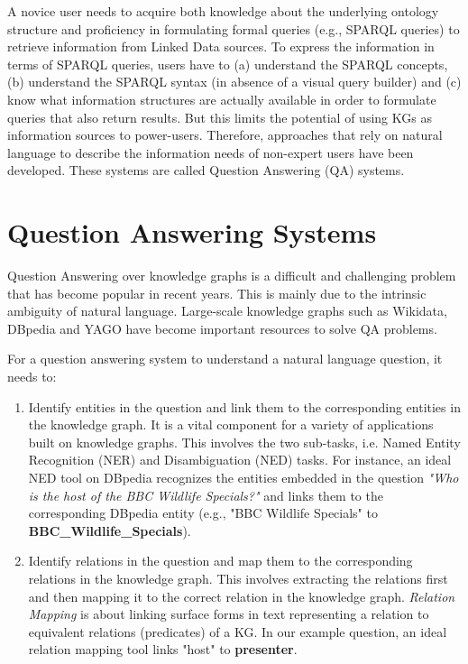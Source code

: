 \begin{sloppypar}
A novice user needs to acquire both knowledge about the underlying ontology structure and proficiency in formulating formal queries (e.g., SPARQL queries) to retrieve information from Linked Data sources. To express the information in terms of SPARQL queries, users have to (a) understand the SPARQL concepts, (b) understand the SPARQL syntax (in absence of a visual query builder) and (c) know what information structures are actually available in order to formulate queries that also return results\cite{sparql}. But this limits the potential of using KGs as information sources to power-users. Therefore, approaches that rely on natural language to describe the information needs of non-expert users have been developed. These systems are called Question Answering (QA) systems.

\section{Question Answering Systems}
Question Answering over knowledge graphs is a difficult and challenging problem that has become popular in recent years. This is mainly due to the intrinsic ambiguity of natural language. Large-scale knowledge graphs such as Wikidata, DBpedia and YAGO have become important resources to solve QA problems. 

For a question answering system to understand a natural language question, it needs to: \begin{enumerate}
\item Identify entities in the question and link them to the corresponding entities in the knowledge graph.  It is a vital
component for a variety of applications built on
knowledge graphs. This involves the two sub-tasks, i.e. Named Entity Recognition (NER) and Disambiguation (NED) tasks. For instance, an ideal NED tool on DBpedia recognizes the entities embedded in the question \textit{"Who is the host of the BBC Wildlife Specials?"} and links them to the corresponding DBpedia entity (e.g., "BBC Wildlife Specials" to
\textbf{BBC\_Wildlife\_Specials}). 

\item Identify relations in the question and map them to the corresponding relations in the knowledge graph. This involves extracting the relations first and then mapping it to the correct relation in the knowledge graph. \textit{Relation Mapping} is about linking surface forms in text representing a relation to equivalent relations (predicates) of a KG\cite{falcon}. In our example question, an ideal relation mapping tool links "host" to \textbf{presenter}.


\end{enumerate}
\end{sloppypar}
